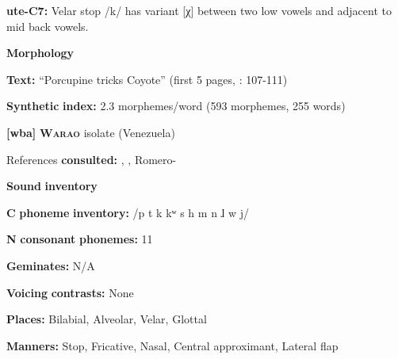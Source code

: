 \documentclass[output=paper]{langsci/langscibook}
\begin{document}
\begin{styleBody}
\textbf{ute-C7:} Velar stop /k/ has variant [χ] between two low vowels and adjacent to mid back vowels.
\end{styleBody}

\begin{styleBody}
\textbf{Morphology}
\end{styleBody}

\begin{styleBody}
\textbf{Text:} “Porcupine tricks Coyote” (first 5 pages, \citealt{Givón2013}: 107-111)
\end{styleBody}

\begin{styleBody}
\textbf{Synthetic} \textbf{index:} 2.3 morphemes/word (593 morphemes, 255 words)
\end{styleBody}

\begin{styleBody}
\textbf{[wba]} \textbf{\textsc{Warao}}  isolate (Venezuela)
\end{styleBody}

\begin{styleBody}
References \textbf{consulted:} \citet{Arinterol2000}, \citet{Osborn1966}, Romero-\citet{Figeroa1997}
\end{styleBody}

\begin{styleBody}
\textbf{Sound} \textbf{inventory}
\end{styleBody}

\begin{styleBody}
\textbf{C} \textbf{phoneme} \textbf{inventory:} /p t k kʷ s h m n ɺ w j/
\end{styleBody}

\begin{styleBody}
\textbf{N} \textbf{consonant} \textbf{phonemes:} 11
\end{styleBody}

\begin{styleBody}
\textbf{Geminates:} N/A
\end{styleBody}

\begin{styleBody}
\textbf{Voicing} \textbf{contrasts:} None
\end{styleBody}

\begin{styleBody}
\textbf{Places:} Bilabial, Alveolar, Velar, Glottal
\end{styleBody}

\begin{styleBody}
\textbf{Manners:} Stop, Fricative, Nasal, Central approximant, Lateral flap
\end{styleBody}
\end{document}
